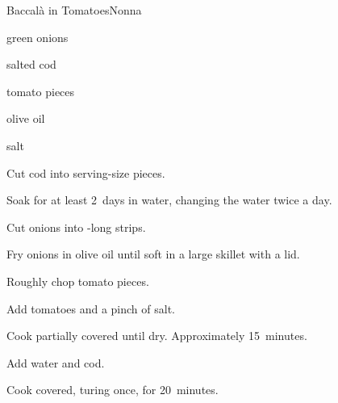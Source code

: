 \begin{recipe}{Baccal\`a in Tomatoes}{Nonna}{}

\begin{ingredients}
\item green onions
\item salted cod
\item tomato pieces
\item olive oil
\item salt
\end{ingredients}

\begin{directions}
\item Cut cod into serving-size pieces.
\item Soak for at least 2~days in water, changing the water twice a day.
\item Cut onions into -long strips.
\item Fry onions in olive oil until soft in a large skillet with a lid.
\item Roughly chop tomato pieces.
\item Add tomatoes and a pinch of salt.
\item Cook partially covered until dry. Approximately 15~minutes.
\item Add \C{\threequarter} water and cod.
\item Cook covered, turing once, for 20~minutes.
\end{directions}

\end{recipe}

